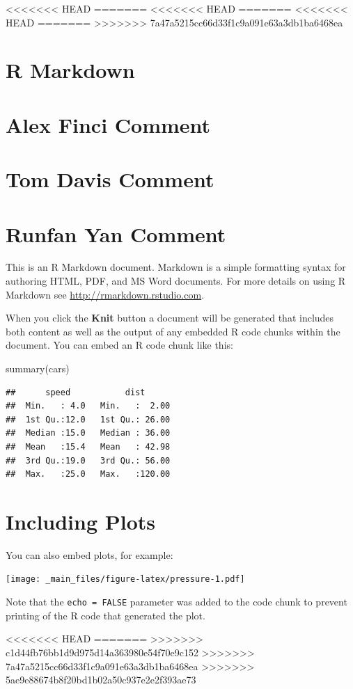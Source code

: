 \documentclass[
]{book}
\newenvironment{Shaded}{\begin{snugshade}}{\end{snugshade}}
\newcommand{\FunctionTok}[1]{\textcolor[rgb]{0.00,0.00,0.00}{#1}}
\newcommand{\NormalTok}[1]{#1}
\begin{document}
<<<<<<< HEAD
=======
<<<<<<< HEAD
=======
<<<<<<< HEAD
=======
>>>>>>> 7a47a5215cc66d33f1c9a091e63a3db1ba6468ea
\hypertarget{r-markdown}{%
\section{R Markdown}\label{r-markdown}}

\hypertarget{alex-finci-comment}{%
\section{Alex Finci Comment}\label{alex-finci-comment}}

\hypertarget{tom-davis-comment}{%
\section{Tom Davis Comment}\label{tom-davis-comment}}

\hypertarget{runfan-yan-comment}{%
\section{Runfan Yan Comment}\label{runfan-yan-comment}}

This is an R Markdown document. Markdown is a simple formatting syntax for authoring HTML, PDF, and MS Word documents. For more details on using R Markdown see \url{http://rmarkdown.rstudio.com}.

When you click the \textbf{Knit} button a document will be generated that includes both content as well as the output of any embedded R code chunks within the document. You can embed an R code chunk like this:

\begin{Shaded}
\begin{Highlighting}[]
\FunctionTok{summary}\NormalTok{(cars)}
\end{Highlighting}
\end{Shaded}

\begin{verbatim}
##      speed           dist       
##  Min.   : 4.0   Min.   :  2.00  
##  1st Qu.:12.0   1st Qu.: 26.00  
##  Median :15.0   Median : 36.00  
##  Mean   :15.4   Mean   : 42.98  
##  3rd Qu.:19.0   3rd Qu.: 56.00  
##  Max.   :25.0   Max.   :120.00
\end{verbatim}

\hypertarget{including-plots}{%
\section{Including Plots}\label{including-plots}}

You can also embed plots, for example:

\texttt{[image: \_main\_files/figure-latex/pressure-1.pdf]}

Note that the \texttt{echo\ =\ FALSE} parameter was added to the code chunk to prevent printing of the R code that generated the plot.

<<<<<<< HEAD
=======
>>>>>>> c1d44fb76bb1d9d975d14a363980e54f70e9c152
>>>>>>> 7a47a5215cc66d33f1c9a091e63a3db1ba6468ea
>>>>>>> 5ae9e88674b8f20bd1b02a50c937e2e2f393ae73
  
\end{document}
